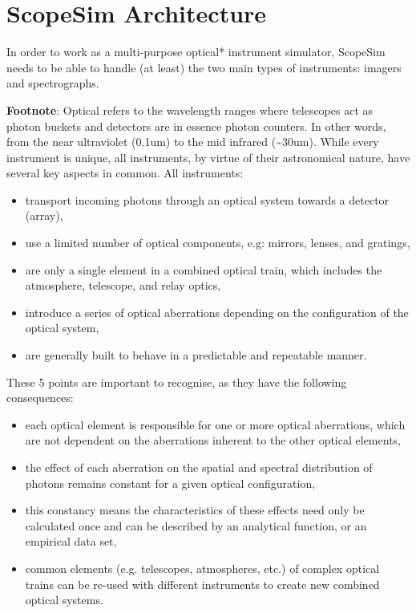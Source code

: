 

\section{ScopeSim Architecture%
  \label{scopesim-architecture}%
}

In order to work as a multi-purpose optical* instrument simulator, ScopeSim needs to be able to handle (at least) the two main types of instruments: imagers and spectrographs.

\textbf{Footnote}: Optical refers to the wavelength ranges where telescopes act as \textquotedbl{}photon buckets\textquotedbl{} and detectors are in essence \textquotedbl{}photon counters\textquotedbl{}.
In other words, from the near ultraviolet (0.1um) to the mid infrared (\textasciitilde{}30um).
While every instrument is unique, all instruments, by virtue of their astronomical nature, have several key aspects in common.
All instruments:

\begin{itemize}
\item transport incoming photons through an optical system towards a detector (array),

\item use a limited number of optical components, e.g: mirrors, lenses, and gratings,

\item are only a single element in a combined optical train, which includes the atmosphere, telescope, and relay optics,

\item introduce a series of optical aberrations depending on the configuration of the optical system,

\item are generally built to behave in a predictable and repeatable manner.
\end{itemize}

These 5 points are important to recognise, as they have the following consequences:

\begin{itemize}
\item each optical element is responsible for one or more optical aberrations, which are not dependent on the aberrations inherent to the other optical elements,

\item the effect of each aberration on the spatial and spectral distribution of photons remains constant for a given optical configuration,

\item this constancy means the characteristics of these effects need only be calculated once and can be described by an analytical function, or an empirical data set,

\item common elements (e.g. telescopes, atmospheres, etc.) of complex optical trains can be re-used with different instruments to create new combined optical systems.
\end{itemize}


